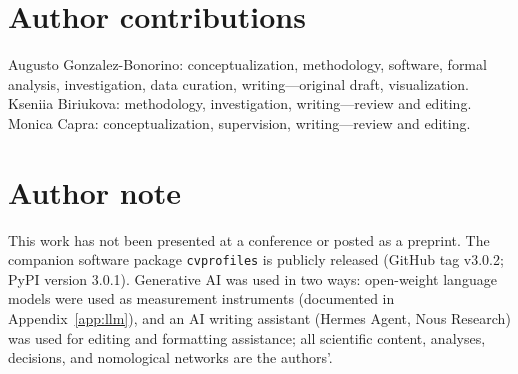 \documentclass[10pt,letterpaper]{article}
\newcommand{\cvp}{\texttt{cvprofiles}}
\begin{document}
\section*{Author contributions}
Augusto Gonzalez-Bonorino: conceptualization, methodology, software, formal analysis, investigation, data curation, writing---original draft, visualization.
Kseniia Biriukova: methodology, investigation, writing---review and editing.
Monica Capra: conceptualization, supervision, writing---review and editing.

\section*{Author note}
This work has not been presented at a conference or posted as a preprint.
The companion software package \cvp{} is publicly released (GitHub tag v3.0.2; PyPI version 3.0.1).
Generative AI was used in two ways: open-weight language models were used as measurement instruments (documented in Appendix~\ref{app:llm}), and an AI writing assistant (Hermes Agent, Nous Research) was used for editing and formatting assistance; all scientific content, analyses, decisions, and nomological networks are the authors'.
\end{document}
